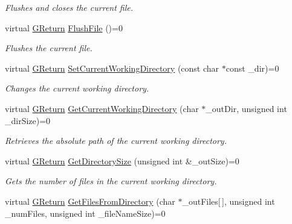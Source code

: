 \begin{DoxyCompactItemize}
\begin{DoxyCompactList}\small\item\em Flushes and closes the current file. \end{DoxyCompactList}\item 
virtual \mbox{\hyperlink{namespace_g_w_a67a839e3df7ea8a5c5686613a7a3de21}{G\+Return}} \mbox{\hyperlink{class_g_w_1_1_s_y_s_t_e_m_1_1_g_file_ae3105b637ef87af268722a696b8657a9}{Flush\+File}} ()=0
\begin{DoxyCompactList}\small\item\em Flushes the current file. \end{DoxyCompactList}\item 
virtual \mbox{\hyperlink{namespace_g_w_a67a839e3df7ea8a5c5686613a7a3de21}{G\+Return}} \mbox{\hyperlink{class_g_w_1_1_s_y_s_t_e_m_1_1_g_file_ab28d2e7ecf3ac893df88603e5448561a}{Set\+Current\+Working\+Directory}} (const char $\ast$const \+\_\+dir)=0
\begin{DoxyCompactList}\small\item\em Changes the current working directory. \end{DoxyCompactList}\item 
virtual \mbox{\hyperlink{namespace_g_w_a67a839e3df7ea8a5c5686613a7a3de21}{G\+Return}} \mbox{\hyperlink{class_g_w_1_1_s_y_s_t_e_m_1_1_g_file_a6853b717e838d1b3a54f22449a37d764}{Get\+Current\+Working\+Directory}} (char $\ast$\+\_\+out\+Dir, unsigned int \+\_\+dir\+Size)=0
\begin{DoxyCompactList}\small\item\em Retrieves the absolute path of the current working directory. \end{DoxyCompactList}\item 
virtual \mbox{\hyperlink{namespace_g_w_a67a839e3df7ea8a5c5686613a7a3de21}{G\+Return}} \mbox{\hyperlink{class_g_w_1_1_s_y_s_t_e_m_1_1_g_file_ac2de86bf6cf61455577efc47277ecb94}{Get\+Directory\+Size}} (unsigned int \&\+\_\+out\+Size)=0
\begin{DoxyCompactList}\small\item\em Gets the number of files in the current working directory. \end{DoxyCompactList}\item 
virtual \mbox{\hyperlink{namespace_g_w_a67a839e3df7ea8a5c5686613a7a3de21}{G\+Return}} \mbox{\hyperlink{class_g_w_1_1_s_y_s_t_e_m_1_1_g_file_ae062d19f84d120adea94756d1d26e41e}{Get\+Files\+From\+Directory}} (char $\ast$\+\_\+out\+Files\mbox{[}$\,$\mbox{]}, unsigned int \+\_\+num\+Files, unsigned int \+\_\+file\+Name\+Size)=0

\end{DoxyCompactItemize}

